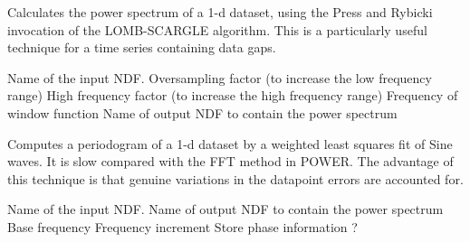 \begin{manroutinedescription}

Calculates the power spectrum of a 1-d dataset, using the
Press and Rybicki invocation of the LOMB-SCARGLE algorithm. 
This is a particularly useful technique for a time series containing 
data gaps. 

\begin{manparametertable}
   Name of the input NDF.
   Oversampling factor (to increase the low frequency range)
   High frequency factor (to increase the high frequency range)
   Frequency of window function 
   Name of output NDF to contain the power spectrum
\end{manparametertable}

\end{manroutinedescription}


\begin{manroutinedescription}

Computes a periodogram of a 1-d dataset by a weighted least squares fit
of Sine waves. It is slow compared with the FFT method in POWER. The
advantage of this technique is that genuine variations in the datapoint
errors are accounted for.

\begin{manparametertable}
   Name of the input NDF.
   Name of output NDF to contain the power spectrum
   Base frequency 
   Frequency increment 
   Store phase information ?
\end{manparametertable}

\end{manroutinedescription}

